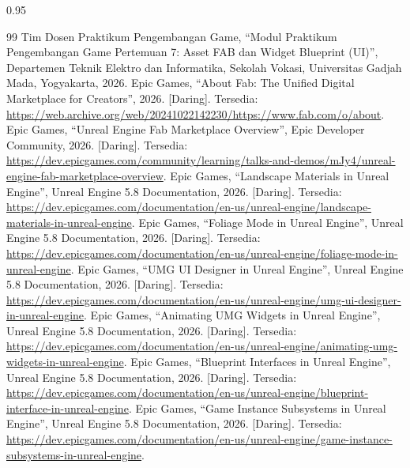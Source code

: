 \documentclass[a4paper,oneside,12pt]{report}
\renewcommand{\bibname}{Daftar Pustaka}
\begin{document}
\clearpage

\renewcommand{\bibname}{Daftar Pustaka}
\begin{spacing}{0.95}
	\begin{thebibliography}{99}
		\setlength{\itemsep}{0.08em}
		 Tim Dosen Praktikum Pengembangan Game, ``Modul Praktikum Pengembangan Game Pertemuan 7: Asset FAB dan Widget Blueprint (UI)'', Departemen Teknik Elektro dan Informatika, Sekolah Vokasi, Universitas Gadjah Mada, Yogyakarta, 2026.
		 Epic Games, ``About Fab: The Unified Digital Marketplace for Creators'', 2026. [Daring]. Tersedia: \url{https://web.archive.org/web/20241022142230/https://www.fab.com/o/about}.
		 Epic Games, ``Unreal Engine Fab Marketplace Overview'', Epic Developer Community, 2026. [Daring]. Tersedia: \url{https://dev.epicgames.com/community/learning/talks-and-demos/mJy4/unreal-engine-fab-marketplace-overview}.
		 Epic Games, ``Landscape Materials in Unreal Engine'', Unreal Engine 5.8 Documentation, 2026. [Daring]. Tersedia: \url{https://dev.epicgames.com/documentation/en-us/unreal-engine/landscape-materials-in-unreal-engine}.
		 Epic Games, ``Foliage Mode in Unreal Engine'', Unreal Engine 5.8 Documentation, 2026. [Daring]. Tersedia: \url{https://dev.epicgames.com/documentation/en-us/unreal-engine/foliage-mode-in-unreal-engine}.
		 Epic Games, ``UMG UI Designer in Unreal Engine'', Unreal Engine 5.8 Documentation, 2026. [Daring]. Tersedia: \url{https://dev.epicgames.com/documentation/en-us/unreal-engine/umg-ui-designer-in-unreal-engine}.
		 Epic Games, ``Animating UMG Widgets in Unreal Engine'', Unreal Engine 5.8 Documentation, 2026. [Daring]. Tersedia: \url{https://dev.epicgames.com/documentation/en-us/unreal-engine/animating-umg-widgets-in-unreal-engine}.
		 Epic Games, ``Blueprint Interfaces in Unreal Engine'', Unreal Engine 5.8 Documentation, 2026. [Daring]. Tersedia: \url{https://dev.epicgames.com/documentation/en-us/unreal-engine/blueprint-interface-in-unreal-engine}.
		 Epic Games, ``Game Instance Subsystems in Unreal Engine'', Unreal Engine 5.8 Documentation, 2026. [Daring]. Tersedia: \url{https://dev.epicgames.com/documentation/en-us/unreal-engine/game-instance-subsystems-in-unreal-engine}.
	\end{thebibliography}
\end{spacing}
\end{document}
